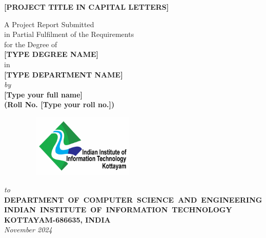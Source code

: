 \documentclass[12pt,a4wide]{report}
\theoremstyle{plain}
\theoremstyle{definition}
\theoremstyle{remark}
\begin{document}

\begin{titlepage}
\enlargethispage{2cm}

\begin{center}

\vspace*{-1cm}

\textbf{\Large [PROJECT TITLE IN CAPITAL LETTERS]}\\[10pt]

\vspace*{2 cm}


                         A Project Report Submitted \\
                     in Partial Fulfilment of the Requirements  \\
                     for the Degree of  \\
                          \vspace{4.5mm}
                   {\Large \bf [TYPE DEGREE NAME] } \\
                   in \\
                   {\large \bf [TYPE DEPARTMENT NAME] } \\

                      \vspace{9mm}
                   {\em  by} \\ \vspace{2.5mm}
             {\large \bf [Type your full name]} \\
{\large \bf (Roll No. [Type your roll no.])}\\[.35in]

\vfill

\begin{figure}[h]
  \begin{center}
  \includegraphics[width=6cm, height=3cm]{logo2.jpg}
  \end{center}
\end{figure}
\vspace*{0.2cm}
{\em\large to }\\%
{\bf \mbox{DEPARTMENT OF COMPUTER SCIENCE AND ENGINEERING}} \\%
{\bf \mbox{INDIAN INSTITUTE OF INFORMATION TECHNOLOGY}}\\%
{\bf KOTTAYAM-686635, INDIA}\\%
{\it November 2024}

\end{center}

\end{titlepage}
\end{document}
